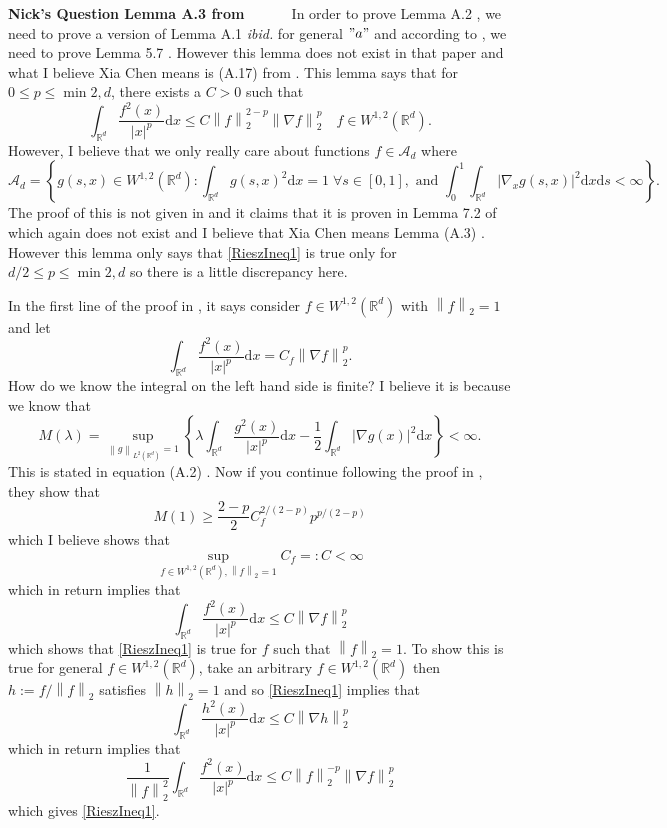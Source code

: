 \documentclass[a4paper,11pt]{article}
\numberwithin{equation}{section}
\theoremstyle{plain}
\theoremstyle{definition}
\newcommand{\ud}{\ensuremath{\mathrm{d} }}
\newcommand{\Norm}[1]{\left\|  #1   \right\|}
\newcommand{\R}{\mathbb{R}}
\newcounter{NQ}
\newenvironment{NickQuestion}[1][] %
{\refstepcounter{NQ}
	\begin{mdframed}[backgroundcolor=lightgray]\textbf{Nick's Question \theNQ \: #1~~}~~~\noindent}%
	{\end{mdframed}}
\numberwithin{NQ}{section}
\numberwithin{LQ}{section}
\numberwithin{ZQ}{section}
\begin{document}
\begin{NickQuestion}[Lemma A.3 from \cite{ChenAOP12}]
In order to prove Lemma A.2 \cite{15AIHP}, we need to prove a version of Lemma A.1 \textit{ibid.} for general $"a"$ and according to \cite{15AIHP}, we need to prove Lemma 5.7 \cite{ChenAOP14}. However this lemma does not exist in that paper and what I believe Xia Chen means is (A.17) from \cite{ChenAOP14}. This lemma says that for $0 \le p \le \min{2,d}$, there exists a $C>0$ such that
	\begin{equation}\label{RieszIneq1}
		\int_{\R^d} \frac{f^2(x)}{|x|^p} \ud x \le C \Norm{f}_2^{2-p}\Norm{\nabla f}_2^p \quad f \in W^{1,2}(\R^d).
	\end{equation}
However, I believe that we only really care about functions $f \in \mathcal{A}_d$ where
	\[
		\mathcal{A}_d = \left\{ g(s,x) \in W^{1,2}(\R^d) : \int_{\R^d} g(s,x)^2 \ud x = 1 \; \forall s \in [0,1], \text{ and } \int_0^1 \int_{\R^d} \left| \nabla_x g(s,x) \right|^2 \ud x \ud s < \infty \right\}.
	\]
The proof of this is not given in \cite{ChenAOP14} and it claims that it is proven in Lemma 7.2 of \cite{ChenAOP12} which again does not exist and I believe that Xia Chen means Lemma (A.3) \cite{ChenAOP12}. However this lemma only says that \eqref{RieszIneq1} is true only for $d/2 \le p \le \min{2,d}$ so there is a little discrepancy here.

In the first line of the proof in \cite{ChenAOP12}, it says consider $f\in W^{1,2}(\R^d)$ with $\Norm{f}_2=1$ and let
	\[
		\int_{\R^d} \frac{f^2(x)}{|x|^p} \ud x = C_f \Norm{\nabla f}_2^p.
	\]
How do we know the integral on the left hand side is finite? I believe it is because we know that
	\[
		M(\lambda) = \sup_{\Norm{g}_{L^2(\R^d)}=1} \left\{ \lambda \int_{\R^d} \frac{g^2(x)}{|x|^p} \ud x - \frac{1}{2} \int_{\R^d} |\nabla g(x)|^2 \ud x  \right\} < \infty .
	\]
This is stated in equation (A.2) \cite{ChenAOP12}. Now if you continue following the proof in \cite{ChenAOP12}, they show that
	\[
		M(1) \ge \frac{2-p}{2}C_f^{2/(2-p)}p^{p/(2-p)}
	\]
which I believe shows that
	\[
		\sup_{f\in W^{1,2}(\R^d), \Norm{f}_2=1} C_f =: C < \infty
	\]
which in return implies that
	\[
		\int_{\R^d} \frac{f^2(x)}{|x|^p} \ud x \le C \Norm{\nabla f}_2^p
	\]
which shows that \eqref{RieszIneq1} is true for $f$ such that $\Norm{f}_2 = 1$. To show this is true for general $f\in W^{1,2}(\R^d)$, take an arbitrary $f \in W^{1,2}(\R^d)$ then $h:=f/\Norm{f}_2$ satisfies $\Norm{h}_2=1$ and so \eqref{RieszIneq1} implies that
	\[
		\int_{\R^d} \frac{h^2(x)}{|x|^p} \ud x \le C \Norm{\nabla h}_2^p
	\]
which in return implies that
	\[
		\frac{1}{\Norm{f}_2^2}\int_{\R^d} \frac{f^2(x)}{|x|^p} \ud x \le C\Norm{f}_2^{-p} \Norm{\nabla f}_2^p
	\]
which gives \eqref{RieszIneq1}.
\end{NickQuestion}
\end{document}
